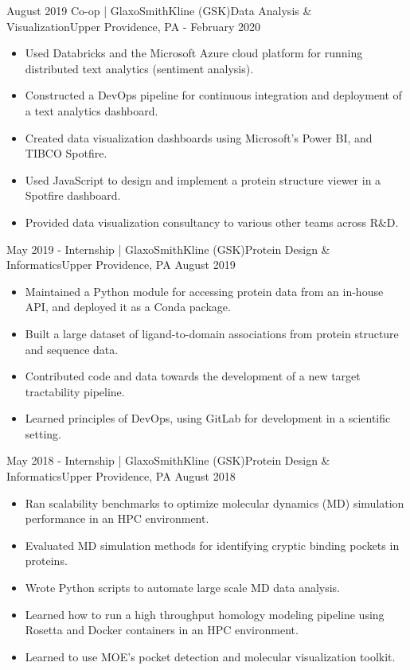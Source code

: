 \begin{experiences}
  \emptySeparator
  \experience
    {August 2019}   {Co-op | GlaxoSmithKline (GSK)}{Data Analysis \& Visualization}{Upper Providence, PA}
    {- February 2020} {
    \begin{itemize}
    \item Used Databricks and the Microsoft Azure cloud platform for running distributed text analytics (sentiment analysis).
    \item Constructed a DevOps pipeline for continuous integration and deployment of a text analytics dashboard.
    \item Created data visualization dashboards using Microsoft's Power BI, and TIBCO Spotfire.
    \item Used JavaScript to design and implement a protein structure viewer in a Spotfire dashboard.
    \item Provided data visualization consultancy to various other teams across R\&D.
    \end{itemize}
    }
  \emptySeparator
  \experience
    {May 2019 -} {Internship | GlaxoSmithKline (GSK)}{Protein Design \& Informatics}{Upper Providence, PA}
    {August 2019}    {
        \begin{itemize}
        \item Maintained a Python module for accessing protein data from an in-house API, and deployed it as a Conda package.
        \item Built a large dataset of ligand-to-domain associations from protein structure and sequence data.
        \item Contributed code and data towards the development of a new target tractability pipeline.
        \item Learned principles of DevOps, using GitLab for development in a scientific setting.
        \end{itemize}
    }
  \emptySeparator
  \experience
    {May 2018 -} {Internship | GlaxoSmithKline (GSK)}{Protein Design \& Informatics}{Upper Providence, PA}
    {August 2018}    {
        \begin{itemize}
        \item Ran scalability benchmarks to optimize molecular dynamics (MD) simulation performance in an HPC environment.
        \item Evaluated MD simulation methods for identifying cryptic binding pockets in proteins.
        \item Wrote Python scripts to automate large scale MD data analysis.
        \item Learned how to run a high throughput homology modeling pipeline using Rosetta and Docker containers in an HPC environment.
        \item Learned to use MOE's pocket detection and molecular visualization toolkit.
        \end{itemize}
    }
                  

\end{experiences}
